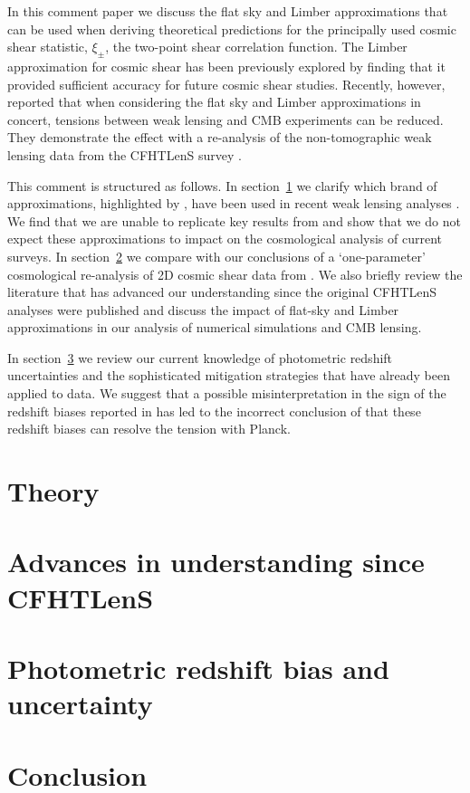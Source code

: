 \documentclass[a4paper, preprint, fleqn, usenatbib]{aastex}
\begin{document}
In this comment paper we discuss the flat sky and Limber approximations that can be used when deriving theoretical predictions for the principally used cosmic shear statistic, $\xi_\pm$, the two-point shear correlation function. The Limber approximation for cosmic shear has been previously explored by \citet{giannantonio/etal:2012} finding that it provided sufficient accuracy for future cosmic shear studies. Recently, however, \citet{kitching/etal:2016} reported that when considering the flat sky and Limber approximations in concert, tensions between weak lensing and CMB experiments can be reduced. They demonstrate the effect with a re-analysis of the non-tomographic weak lensing data from the CFHTLenS survey \citep{kilbinger/etal:2013}.    

This comment is structured as follows.  In section~\ref{sec:theory} we clarify which brand of approximations, highlighted by \citet{kitching/etal:2016}, have been used in recent weak lensing analyses \citep{joudaki/etal:2016, hildebrandt/etal:2016, joudaki/etal:2017}.  We find that we are unable to replicate key results from \citet{kitching/etal:2016} and show that we do not expect these approximations to impact on the cosmological analysis of current surveys. In section~\ref{sec:cfhtlens} we compare with \citet{kitching/etal:2016} our conclusions of a `one-parameter' cosmological re-analysis of 2D cosmic shear data from \citet{kilbinger/etal:2013}.  We also briefly review the literature that has advanced our understanding since the original CFHTLenS analyses were published and discuss the impact of flat-sky and Limber approximations in our analysis of numerical simulations and CMB lensing.

In section~\ref{sec:photoz} we review our current knowledge of photometric redshift uncertainties and the sophisticated mitigation strategies that have already been applied to data.  We suggest that a possible misinterpretation in the sign of the redshift biases reported in \citet{choi/etal:2016} has led to the incorrect conclusion of \citet{kitching/etal:2016} that these redshift biases can resolve the tension with Planck.  

\section{Theory}
\label{sec:theory}


\section{Advances in understanding since CFHTLenS}
\label{sec:cfhtlens}


\section{Photometric redshift bias and uncertainty}
\label{sec:photoz}


\section{Conclusion}
\label{sec:conclusion}




\end{document}
